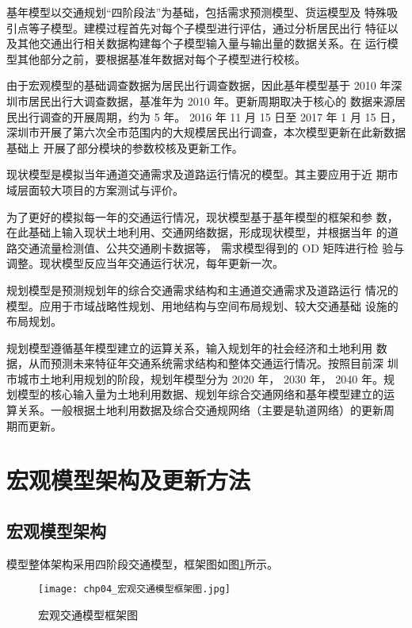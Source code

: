 基年模型以交通规划“四阶段法”为基础，包括需求预测模型、货运模型及
特殊吸引点等子模型。建模过程首先对每个子模型进行评估，通过分析居民出行
特征以及其他交通出行相关数据构建每个子模型输入量与输出量的数据关系。在
运行模型其他部分之前，要根据基准年数据对每个子模型进行校核。

由于宏观模型的基础调查数据为居民出行调查数据，因此基年模型基于
2010 年深圳市居民出行大调查数据，基准年为 2010 年。更新周期取决于核心的
数据来源居民出行调查的开展周期，约为 5 年。 2016 年 11 月 15 日至 2017 年 1
月 15 日，深圳市开展了第六次全市范围内的大规模居民出行调查，本次模型更新在此新数据基础上
开展了部分模块的参数校核及更新工作。

现状模型是模拟当年通道交通需求及道路运行情况的模型。其主要应用于近
期市域层面较大项目的方案测试与评价。

为了更好的模拟每一年的交通运行情况，现状模型基于基年模型的框架和参
数，在此基础上输入现状土地利用、交通网络数据，形成现状模型，并根据当年
的道路交通流量检测值、公共交通刷卡数据等， 需求模型得到的 OD 矩阵进行检
验与调整。现状模型反应当年交通运行状况，每年更新一次。

规划模型是预测规划年的综合交通需求结构和主通道交通需求及道路运行
情况的模型。应用于市域战略性规划、用地结构与空间布局规划、较大交通基础
设施的布局规划。

规划模型遵循基年模型建立的运算关系，输入规划年的社会经济和土地利用
数据，从而预测未来特征年交通系统需求结构和整体交通运行情况。按照目前深
圳市城市土地利用规划的阶段，规划年模型分为 2020 年， 2030 年， 2040 年。规
划模型的核心输入量为土地利用数据、规划年综合交通网络和基年模型建立的运
算关系。一般根据土地利用数据及综合交通规网络（主要是轨道网络）的更新周
期而更新。

\section{宏观模型架构及更新方法}
\subsection{宏观模型架构}
模型整体架构采用四阶段交通模型，框架图如图\ref{fig:chp04_宏观交通模型框架图}所示。

\begin{figure}[ht]
  \centering
  \texttt{[image: chp04\_宏观交通模型框架图.jpg]}
  \caption{宏观交通模型框架图\label{fig:chp04_宏观交通模型框架图} }
\end{figure}

